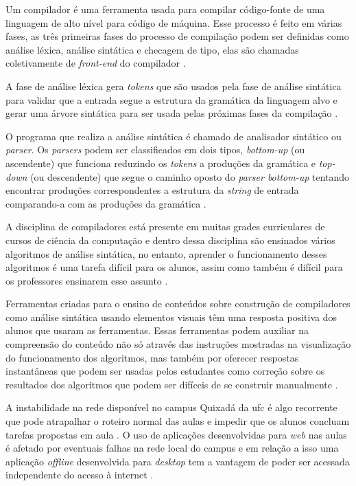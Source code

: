 \label{cap:introducao}

Um compilador é uma ferramenta usada para compilar código-fonte de uma linguagem de alto nível para código de máquina. Esse processo é feito em várias fases, as três primeiras fases do processo de compilação podem ser definidas como análise léxica, análise sintática e checagem de tipo, elas são chamadas coletivamente de \textit{front-end} do compilador \cite{mogensen2024introduction}.

A fase de análise léxica gera \textit{tokens} que são usados pela fase de análise sintática para validar que a entrada segue a estrutura da gramática da linguagem alvo e gerar uma árvore sintática para ser usada pelas próximas fases da compilação \cite{thain2020introduction}.

O programa que realiza a análise sintática é chamado de analisador sintático ou \textit{parser}. Os \textit{parsers} podem ser classificados em dois tipos, \textit{bottom-up} (ou ascendente) que funciona reduzindo os \textit{tokens} a produções da gramática e \textit{top-down} (ou descendente) que segue o caminho oposto do \textit{parser bottom-up} tentando encontrar produções correspondentes a estrutura da \textit{string} de entrada comparando-a com as produções da gramática \cite{cooper2022engineering}.

A disciplina de compiladores está presente em muitas grades curriculares de cursos de ciência da computação e dentro dessa disciplina são ensinados vários algoritmos de análise sintática, no entanto, aprender o funcionamento desses algoritmos é uma tarefa difícil para os alunos, assim como também é difícil para os professores ensinarem esse assunto \cite{sangal2018pavt}.

Ferramentas criadas para o ensino de conteúdos sobre construção de compiladores como análise sintática usando elementos visuais têm uma resposta positiva dos alunos que usaram as ferramentas. Essas ferramentas podem auxiliar na compreensão do conteúdo não só através das instruções mostradas na visualização do funcionamento dos algoritmos, mas também por oferecer respostas instantâneas que podem ser usadas pelos estudantes como correção sobre os resultados dos algoritmos que podem ser difíceis de se construir manualmente \cite{10.1145/3002136}.

A instabilidade na rede disponível no campus Quixadá da \gls{ufc} é algo recorrente que pode atrapalhar o roteiro normal das aulas e impedir que os alunos concluam tarefas propostas em aula \cite{perez2023impact}. O uso de aplicações desenvolvidas para \textit{web} nas aulas é afetado por eventuais falhas na rede local do campus e em relação a isso uma aplicação \textit{offline} desenvolvida para \textit{desktop} tem a vantagem de poder ser acessada independente do acesso à internet \cite{holzer2012mobile}.

